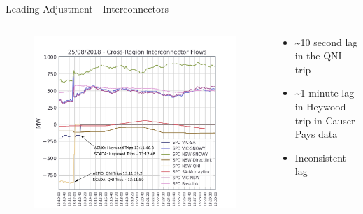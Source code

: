 \begin{frame}{Leading Adjustment - Interconnectors}

  \begin{columns}
    \begin{column}{0.6\linewidth}
    \begin{figure}[t]
        \vspace{-0.5cm}
        \centering
        \includegraphics[width=\linewidth]{figures/interconnector_flows_annotated.png}
        \label{fig:intercon}
    \end{figure}
    \end{column}
    
    \begin{column}{0.4\linewidth}
    \begin{itemize}
        \item \textasciitilde10 second lag in the QNI trip
        \item \textasciitilde1 minute lag in Heywood trip in Causer Pays data
        \item Inconsistent lag
    \end{itemize}
    \end{column}
  \end{columns}


\end{frame}
